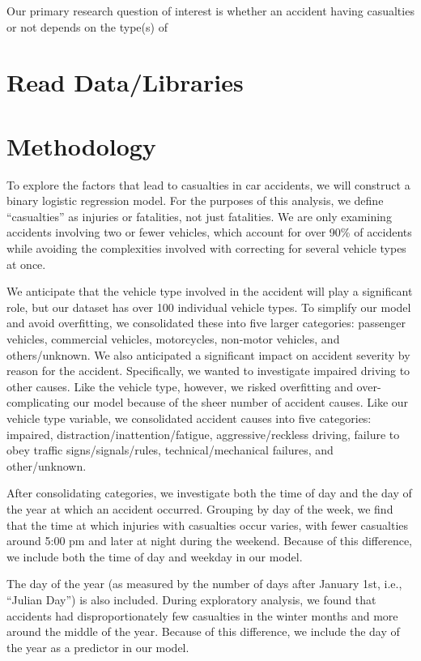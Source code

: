 \documentclass[
  letterpaper,
  DIV=11,
  numbers=noendperiod]{scrartcl}
\begin{document}
Our primary research question of interest is whether an accident having
casualties or not depends on the type(s) of

\hypertarget{read-datalibraries}{%
\section{Read Data/Libraries}\label{read-datalibraries}}

\hypertarget{methodology}{%
\section{Methodology}\label{methodology}}

To explore the factors that lead to casualties in car accidents, we will
construct a binary logistic regression model. For the purposes of this
analysis, we define ``casualties'' as injuries or fatalities, not just
fatalities. We are only examining accidents involving two or fewer
vehicles, which account for over 90\% of accidents while avoiding the
complexities involved with correcting for several vehicle types at once.

We anticipate that the vehicle type involved in the accident will play a
significant role, but our dataset has over 100 individual vehicle types.
To simplify our model and avoid overfitting, we consolidated these into
five larger categories: passenger vehicles, commercial vehicles,
motorcycles, non-motor vehicles, and others/unknown. We also anticipated
a significant impact on accident severity by reason for the accident.
Specifically, we wanted to investigate impaired driving to other causes.
Like the vehicle type, however, we risked overfitting and
over-complicating our model because of the sheer number of accident
causes. Like our vehicle type variable, we consolidated accident causes
into five categories: impaired, distraction/inattention/fatigue,
aggressive/reckless driving, failure to obey traffic
signs/signals/rules, technical/mechanical failures, and other/unknown.

After consolidating categories, we investigate both the time of day and
the day of the year at which an accident occurred. Grouping by day of
the week, we find that the time at which injuries with casualties occur
varies, with fewer casualties around 5:00 pm and later at night during
the weekend. Because of this difference, we include both the time of day
and weekday in our model.

The day of the year (as measured by the number of days after January
1st, i.e., ``Julian Day'') is also included. During exploratory
analysis, we found that accidents had disproportionately few casualties
in the winter months and more around the middle of the year. Because of
this difference, we include the day of the year as a predictor in our
model.
\end{document}
